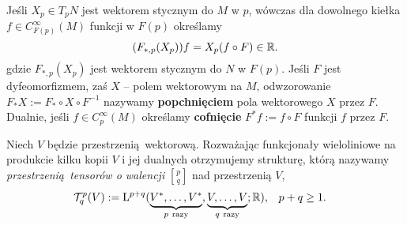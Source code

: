 Jeśli \(X_p\in T_p N\) jest wektorem stycznym do \(M\) w \(p\), wówczas dla dowolnego kiełka \(f\in C_{F(p)}^\infty(M)\) funkcji w \(F(p)\) określamy 
\begin{equation}
(F_{\ast, p} (X_p))f = X_p(f\circ F) \in \mathbb{R}.
\end{equation} 
gdzie \(F_{\ast, p} (X_p)\) jest wektorem stycznym do \(N\) w \(F(p)\). Jeśli \(F\) jest dyfeomorfizmem, zaś \(X\) -- polem wektorowym na \(M\), odwzorowanie \(F_\ast X := F_\ast \circ X \circ F^{-1}\) nazywamy \textbf{popchnięciem} pola wektorowego \(X\) przez \(F\). Dualnie, jeśli \(f\in C_p^\infty(M)\) określamy \textbf{cofnięcie} \(F^\ast f := f\circ F\) funkcji \(f\) przez \(F\).


Niech \(V\) będzie przestrzenią wektorową. Rozważając funkcjonały wieloliniowe na produkcie kilku kopii \(V\) i jej dualnych otrzymujemy strukturę, którą nazywamy \emph{przestrzenią tensorów o walencji} \({p \brack q}\) nad przestrzenią \(V\),
\begin{align*}
    \mathcal{T}_q^p(V) := \mathrm{L}^{p+q}(\underbrace{V^\ast, \dots, V^\ast}_{p\ \text{razy}} ,\underbrace{V,\dots, V}_{q\ \text{razy}}; \mathbb{R}) , &\quad p+q\geq 1.
\end{align*}
